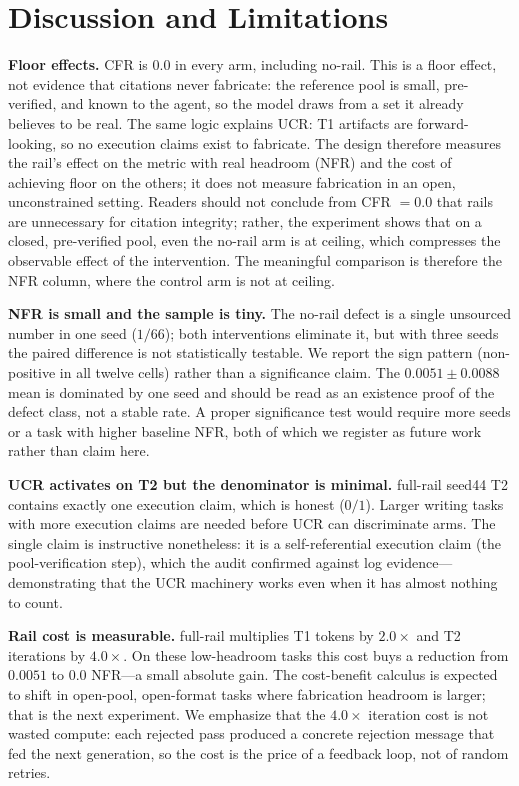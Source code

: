 \documentclass[10pt,twocolumn]{article}
\begin{document}
\section{Discussion and Limitations}
\label{sec:discussion}

\textbf{Floor effects.} CFR is $0.0$ in every arm, including no-rail. This is a floor effect, not evidence that citations never fabricate: the reference pool is small, pre-verified, and known to the agent, so the model draws from a set it already believes to be real. The same logic explains UCR: T1 artifacts are forward-looking, so no execution claims exist to fabricate. The design therefore measures the rail's effect on the metric with real headroom (NFR) and the cost of achieving floor on the others; it does not measure fabrication in an open, unconstrained setting. Readers should not conclude from CFR $= 0.0$ that rails are unnecessary for citation integrity; rather, the experiment shows that on a closed, pre-verified pool, even the no-rail arm is at ceiling, which compresses the observable effect of the intervention. The meaningful comparison is therefore the NFR column, where the control arm is not at ceiling.

\textbf{NFR is small and the sample is tiny.} The no-rail defect is a single unsourced number in one seed ($1/66$); both interventions eliminate it, but with three seeds the paired difference is not statistically testable. We report the sign pattern (non-positive in all twelve cells) rather than a significance claim. The $0.0051 \pm 0.0088$ mean is dominated by one seed and should be read as an existence proof of the defect class, not a stable rate. A proper significance test would require more seeds or a task with higher baseline NFR, both of which we register as future work rather than claim here.

\textbf{UCR activates on T2 but the denominator is minimal.} full-rail seed44 T2 contains exactly one execution claim, which is honest ($0/1$). Larger writing tasks with more execution claims are needed before UCR can discriminate arms. The single claim is instructive nonetheless: it is a self-referential execution claim (the pool-verification step), which the audit confirmed against log evidence---demonstrating that the UCR machinery works even when it has almost nothing to count.

\textbf{Rail cost is measurable.} full-rail multiplies T1 tokens by $2.0\times$ and T2 iterations by $4.0\times$. On these low-headroom tasks this cost buys a reduction from $0.0051$ to $0.0$ NFR---a small absolute gain. The cost-benefit calculus is expected to shift in open-pool, open-format tasks where fabrication headroom is larger; that is the next experiment. We emphasize that the $4.0\times$ iteration cost is not wasted compute: each rejected pass produced a concrete rejection message that fed the next generation, so the cost is the price of a feedback loop, not of random retries.
\end{document}
